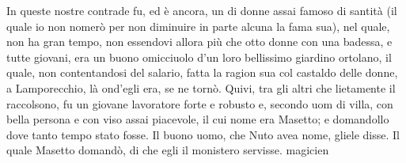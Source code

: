 \documentclass[a4paper,11pt]{book}
\begin{document}
\beginnumbering
\pstart
In queste nostre contrade fu, ed è ancora, un  di donne assai famoso di santità 
(il quale io non nomerò per non diminuire in parte alcuna la fama sua), nel quale, non ha gran 
tempo, non essendovi allora più che otto donne con una badessa, e tutte giovani, era un buono 
omicciuolo d'un loro bellissimo giardino ortolano, il quale, non contentandosi del salario, fatta la 
ragion sua col castaldo delle donne, a Lamporecchio, là ond'egli era, se ne tornò. Quivi, tra gli 
altri che lietamente il raccolsono, fu un giovane lavoratore forte e robusto e, secondo uom di villa, 
con bella persona e con viso assai piacevole, il cui nome era Masetto; e 
domandollo dove tanto tempo stato fosse. Il buono uomo, che Nuto avea nome, 
gliele disse. Il quale Masetto domandò, di che egli il monistero servisse. \gls{magicien}
\pend
\endnumbering
\printglossaries
\end{document}
